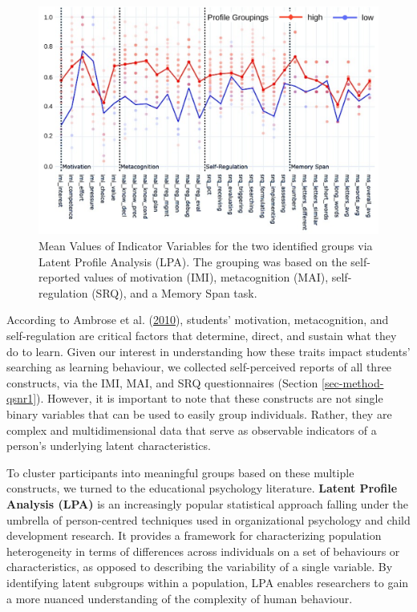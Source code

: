 \documentclass[letterpaper, nobind]{templates/ociamthesis}
\begin{document}
\begin{figure}

{\centering \includegraphics[width=1\linewidth]{figs/lpa-profile-means} 

}

\caption[Groups identified by Latent Profile Analysis.]{Mean Values of Indicator Variables for the two identified groups via Latent Profile Analysis (LPA). The grouping was based on the self-reported values of motivation (IMI), metacognition (MAI), self-regulation (SRQ), and a Memory Span task.}\label{fig:lpa-profile-means}
\end{figure}





According to Ambrose et al. (\protect\hyperlink{ref-ambrose2010howa}{2010}), students' motivation, metacognition, and self-regulation are critical factors that determine, direct, and sustain what they do to learn.
Given our interest in understanding how these traits impact students' searching as learning behaviour, we collected self-perceived reports of all three constructs, via the IMI, MAI, and SRQ questionnaires (Section \ref{sec-method-qsnr1}).
However, it is important to note that these constructs are not single binary variables that can be used to easily group individuals. Rather, they are complex and multidimensional data that serve as observable indicators of a person's underlying latent characteristics.

To cluster participants into meaningful groups based on these multiple constructs, we turned to the educational psychology literature.
\textbf{Latent Profile Analysis (LPA)} is an increasingly popular statistical approach falling under the umbrella of person-centred techniques used in organizational psychology and child development research. It provides a framework for characterizing population heterogeneity in terms of differences across individuals on a set of behaviours or characteristics, as opposed to describing the variability of a single variable. By identifying latent subgroups within a population, LPA enables researchers to gain a more nuanced understanding of the complexity of human behaviour.
\end{document}
